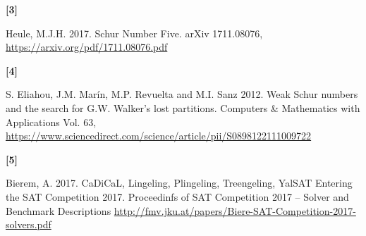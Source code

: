 \documentclass{article}
\newtheorem{computational theorem}{Computational Theorem}[section]
\begin{document}
\hypertarget{label3}{\textbf{[3]}} Heule, M.J.H. 2017. Schur Number Five. arXiv 1711.08076, \url{https://arxiv.org/pdf/1711.08076.pdf}

\hypertarget{label4}{\textbf{[4]}} S. Eliahou, J.M. Marín, M.P. Revuelta and M.I. Sanz 2012. Weak Schur numbers and the search for G.W. 
Walker’s lost partitions. Computers \& Mathematics with Applications Vol. 63, \url{https://www.sciencedirect.com/science/article/pii/S0898122111009722}

\hypertarget{label5}{\textbf{[5]}} Bierem, A. 2017. CaDiCaL, Lingeling, Plingeling, Treengeling, YalSAT Entering the SAT Competition 2017. 
Proceedinfs of SAT Competition 2017 -- Solver and Benchmark Descriptions \url{http://fmv.jku.at/papers/Biere-SAT-Competition-2017-solvers.pdf}
\end{document}
